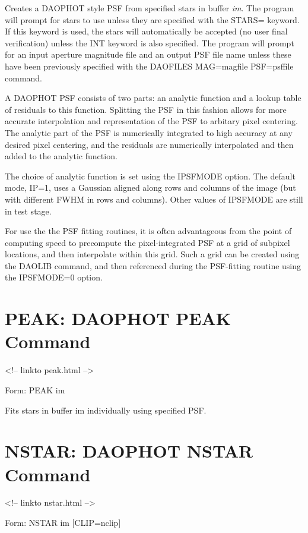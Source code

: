 Creates a DAOPHOT style PSF from specified stars in buffer \textit{im}. 
The program
will prompt for stars to use unless they are specified with the STARS=
keyword. If this keyword is used, the stars will automatically be accepted
(no user final verification) unless the INT keyword is also
specified. The program will prompt for an input aperture magnitude file and
an output PSF file name unless these have been previously specified with
the DAOFILES MAG=magfile PSF=psffile command.

A DAOPHOT PSF consists of two parts: an analytic function and a lookup
table of residuals to this function. Splitting the PSF in this fashion allows
for more accurate interpolation and representation of the PSF to arbitary
pixel centering. The analytic part of the PSF is numerically integrated to
high accuracy at any desired pixel centering, and the residuals are 
numerically interpolated and then added to the analytic function.

The choice of analytic function is set using the IPSFMODE option. The default
mode, IP=1, uses a Gaussian aligned along rows and columns of the image (but
with different FWHM in rows and columns). Other values of IPSFMODE are still
in test stage.

For use the the PSF fitting routines, it is often advantageous from the point
of computing speed to precompute the pixel-integrated PSF at a grid of 
subpixel locations, and then interpolate within this grid. Such a grid
can be created using the DAOLIB command, and then referenced during the
PSF-fitting routine using the IPSFMODE=0 option.

\section{PEAK: DAOPHOT PEAK Command} 
\begin{rawhtml}
<!-- linkto peak.html -->
\end{rawhtml}
\begin{command} 
  \item[Form: PEAK im\hfill]{} \end{command}

Fits stars in buffer im individually using specified PSF.

\section{NSTAR: DAOPHOT NSTAR Command}
\begin{rawhtml}
<!-- linkto nstar.html -->
\end{rawhtml}
\begin{command}
  \item[Form: NSTAR im  {[CLIP=nclip]}\hfill]{}
\end{command}

